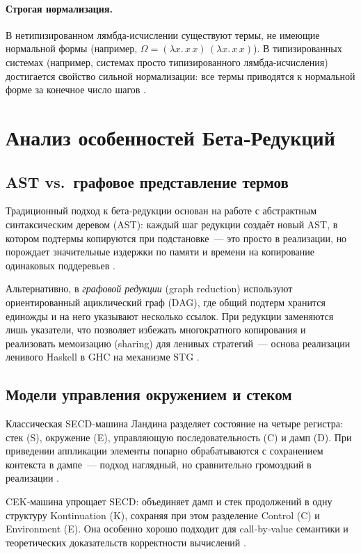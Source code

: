 \paragraph{Строгая нормализация.} В нетипизированном лямбда‑исчислении существуют термы, не имеющие нормальной формы (например, \(\Omega = (\lambda x.\,x\,x)\,(\lambda x.\,x\,x)\)). В типизированных системах (например, системах просто типизированного лямбда‑исчисления) достигается свойство сильной нормализации: все термы приводятся к нормальной форме за конечное число шагов \cite{Barendregt1984}.



\section{Анализ особенностей Бета‑Редукций}
\label{sec:features-beta}


\subsection{AST vs.\ графовое представление термов}
Традиционный подход к бета‑редукции основан на работе с абстрактным синтаксическим деревом (AST): каждый шаг редукции создаёт новый AST, в котором подтермы копируются при подстановке — это просто в реализации, но порождает значительные издержки по памяти и времени на копирование одинаковых поддеревьев \cite{Pierce2002}\cite{HindleySeldin2008}.  

Альтернативно, в \emph{графовой редукции} (graph reduction) используют ориентированный ациклический граф (DAG), где общий подтерм хранится единожды и на него указывают несколько ссылок. При редукции заменяются лишь указатели, что позволяет избежать многократного копирования и реализовать мемоизацию (sharing) для ленивых стратегий — основа реализации ленивого Haskell в GHC на механизме STG \cite{PeytonJones1992}\cite{Barendregt1993}.  

\subsection{Модели управления окружением и стеком}
Классическая \textsc{SECD}‑машина Ландина разделяет состояние на четыре регистра: стек (S), окружение (E), управляющую последовательность (C) и дамп (D). При приведении аппликации элементы попарно обрабатываются с сохранением контекста в дампе — подход наглядный, но сравнительно громоздкий в реализации \cite{Landin1964}\cite{Felleisen1987}.  

\textsc{CEK}‑машина упрощает SECD: объединяет дамп и стек продолжений в одну структуру Kontinuation (K), сохраняя при этом разделение Control (C) и Environment (E). Она особенно хорошо подходит для call‑by‑value семантики и теоретических доказательств корректности вычислений \cite{Felleisen1987}\cite{Plotkin1975}.  

